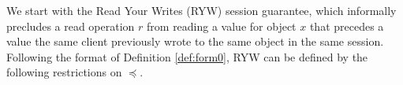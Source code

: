 \documentclass[journal,compsoc]{IEEEtran}
\begin{document}
We start with the Read Your Writes (RYW) session guarantee, which informally precludes a read operation $r$ from reading a value for object $x$ that precedes a value the same client previously wrote to the same object in the same session.
Following the format of Definition \ref{def:form0}, RYW can be defined by the following restrictions on $\preccurlyeq$.
\end{document}
